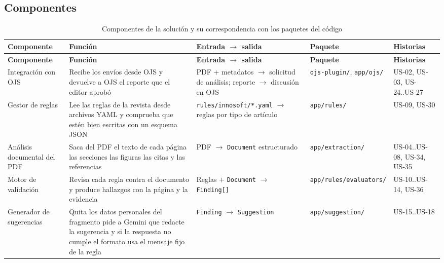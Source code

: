 \subsection{Componentes}

{\small
\begin{longtable}{@{}>{\raggedright\arraybackslash}p{}>{\raggedright\arraybackslash}p{}>{\raggedright\arraybackslash}p{}>{\raggedright\arraybackslash}p{}>{\raggedright\arraybackslash}p{}@{}}
\caption{Componentes de la solución y su correspondencia con los paquetes del código}\label{tab:3-1}\\
\toprule
\textbf{Componente} & \textbf{Función} & \textbf{Entrada $\rightarrow$ salida} & \textbf{Paquete} & \textbf{Historias} \\
\midrule
\endfirsthead
\toprule
\textbf{Componente} & \textbf{Función} & \textbf{Entrada $\rightarrow$ salida} & \textbf{Paquete} & \textbf{Historias} \\
\midrule
\endhead
\bottomrule
\endfoot
\endlastfoot
Integración con OJS & Recibe los envíos desde OJS y devuelve a OJS el reporte que el editor aprobó & PDF + metadatos $\rightarrow$ solicitud de análisis; reporte $\rightarrow$ discusión en OJS & \texttt{ojs-plugin/\allowbreak{}}, \texttt{app/\allowbreak{}ojs/\allowbreak{}} & US-02, US-03, US-24..US-27 \\
Gestor de reglas & Lee las reglas de la revista desde archivos YAML y comprueba que estén bien escritas con un esquema JSON & \texttt{rules/\allowbreak{}innosoft/\allowbreak{}*.\allowbreak{}yaml} $\rightarrow$ reglas por tipo de artículo & \texttt{app/\allowbreak{}rules/\allowbreak{}} & US-09, US-30 \\
Análisis documental del PDF & Saca del PDF el texto de cada página las secciones las figuras las citas y las referencias & PDF $\rightarrow$ \texttt{Document} estructurado & \texttt{app/\allowbreak{}extraction/\allowbreak{}} & US-04..US-08, US-34, US-35 \\
Motor de validación & Revisa cada regla contra el documento y produce hallazgos con la página y la evidencia & Reglas + \texttt{Document} $\rightarrow$ \texttt{Finding[]} & \texttt{app/\allowbreak{}rules/\allowbreak{}evaluators/\allowbreak{}} & US-10..US-14, US-36 \\
Generador de sugerencias & Quita los datos personales del fragmento pide a Gemini que redacte la sugerencia y si la respuesta no cumple el formato usa el mensaje fijo de la regla & \texttt{Finding} $\rightarrow$ \texttt{Suggestion} & \texttt{app/\allowbreak{}suggestion/\allowbreak{}} & US-15..US-18 \\

\end{longtable}}
